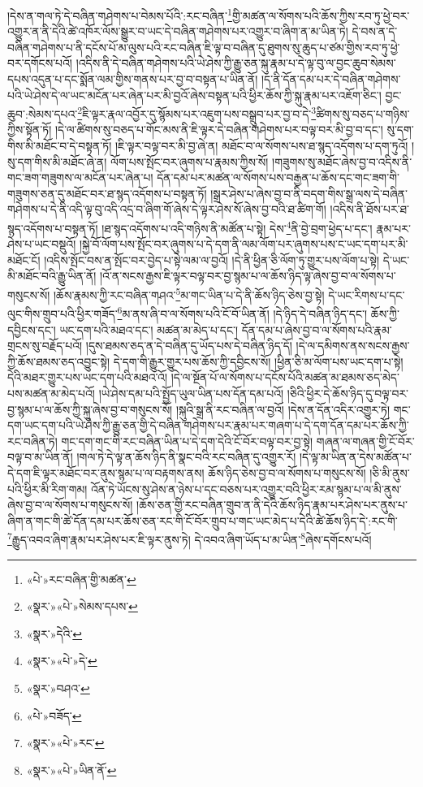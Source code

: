 །དེས་ན་གལ་ཏེ་དེ་བཞིན་གཤེགས་པ་བེམས་པོའི་:རང་བཞིན་\footnote{«པེ་»རང་བཞིན་གྱི་མཚན་}གྱི་མཚན་ལ་སོགས་པའི་ཆོས་ཀྱིས་རབ་ཏུ་ཕྱེ་བར་འགྱུར་ན་ནི་དེའི་ཚེ་འཁོར་ལོས་སྒྱུར་བ་ཡང་དེ་བཞིན་གཤེགས་པར་འགྱུར་བ་ཞིག་ན་མ་ཡིན་ཏེ། དེ་བས་ན་དེ་བཞིན་གཤེགས་པ་ནི་དངོས་པོ་མ་ལུས་པའི་རང་བཞིན་ཇི་ལྟ་བ་བཞིན་དུ་ཐུགས་སུ་ཆུད་པ་ཙམ་གྱིས་རབ་ཏུ་ཕྱེ་བར་དགོངས་པའོ། །འདིས་ནི་དེ་བཞིན་གཤེགས་པའི་ཡེ་ཤེས་ཀྱི་རྒྱུ་ཅན་སྐུ་རྣམ་པ་དེ་ལྟ་བུ་ལ་བྱང་ཆུབ་སེམས་དཔས་འདུན་པ་དང་སྨོན་ལམ་གྱིས་གནས་པར་བྱ་བ་བསྟན་པ་ཡིན་ནོ། །ད་ནི་དོན་དམ་པར་དེ་བཞིན་གཤེགས་པའི་ཡེ་ཤེས་དེ་ལ་ཡང་མངོན་པར་ཞེན་པར་མི་བྱའོ་ཞེས་བསྟན་པའི་ཕྱིར་ཆོས་ཀྱི་སྐུ་རྣམ་པར་འཇོག་ཅིང་། བྱང་ཆུབ་:སེམས་དཔའ་\footnote{«སྣར་»«པེ་»སེམས་དཔས་}ཇི་ལྟར་རྣལ་འབྱོར་དུ་སྙོམས་པར་འཇུག་པས་བསྒྲུབ་པར་བྱ་བ་དེ་\footnote{«སྣར་»དེའི་}ཚིགས་སུ་བཅད་པ་གཉིས་ཀྱིས་སྟོན་ཏོ། །དེ་ལ་ཚིགས་སུ་བཅད་པ་གོང་མས་ནི་ཇི་ལྟར་དེ་བཞིན་གཤེགས་པར་བལྟ་བར་མི་བྱ་བ་དང་། སུ་དག་གིས་མི་མཐོང་བ་དེ་བསྟན་ཏོ། །ཇི་ལྟར་བལྟ་བར་མི་བྱ་ཞེ་ན། མཐོང་བ་ལ་སོགས་པས་ཐ་སྙད་འདོགས་པ་དག་ཏུའོ། །སུ་དག་གིས་མི་མཐོང་ཞེ་ན། ལོག་པས་སྤོང་བར་ཞུགས་པ་རྣམས་ཀྱིས་སོ། །གཟུགས་སུ་མཐོང་ཞེས་བྱ་བ་འདིས་ནི་གང་ཟག་གཟུགས་ལ་མངོན་པར་ཞེན་པ། དོན་དམ་པར་མཚན་ལ་སོགས་པས་བརྒྱན་པ་ཆོས་དང་གང་ཟག་གི་གཟུགས་ཅན་དུ་མཐོང་བར་ཐ་སྙད་འདོགས་པ་བསྟན་ཏོ། །སྒྲར་ཤེས་པ་ཞེས་བྱ་བ་ནི་བདག་གིས་སྒྲ་ལས་དེ་བཞིན་གཤེགས་པ་དེ་ནི་འདི་ལྟ་བུ་འདི་འདྲ་བ་ཞིག་གོ་ཞེས་དེ་ལྟར་ཤེས་སོ་ཞེས་བྱ་བའི་ཐ་ཚིག་གོ། །འདིས་ནི་ཐོས་པར་ཐ་སྙད་འདོགས་པ་བསྟན་ཏོ། །ཐ་སྙད་འདོགས་པ་འདི་གཉིས་ནི་མཚོན་པ་སྟེ། དེས་\footnote{«སྣར་»«པེ་»དེ་}ནི་བྱེ་བྲག་ཕྱེད་པ་དང་། རྣམ་པར་ཤེས་པ་ཡང་བསྡུའོ། །སྐྱེ་བོ་ལོག་པས་སྤོང་བར་ཞུགས་པ་དེ་དག་ནི་ལམ་ལོག་པར་ཞུགས་པས་ང་ཡང་དག་པར་མི་མཐོང་ངོ། །འདིས་སྤོང་བས་ན་སྤོང་བར་བྱེད་པ་སྟེ་ལམ་ལ་བྱའོ། །དེ་ནི་ཕྱིན་ཅི་ལོག་ཏུ་གྱུར་པས་ལོག་པ་སྟེ། དེ་ཡང་མི་མཐོང་བའི་རྒྱུ་ཡིན་ནོ། །འོ་ན་སངས་རྒྱས་ཇི་ལྟར་བལྟ་བར་བྱ་སྙམ་པ་ལ་ཆོས་ཉིད་ལྟ་ཞེས་བྱ་བ་ལ་སོགས་པ་གསུངས་སོ། །ཆོས་རྣམས་ཀྱི་རང་བཞིན་གཤའ་\footnote{«སྣར་»བཤའ་}མ་གང་ཡིན་པ་དེ་ནི་ཆོས་ཉིད་ཅེས་བྱ་སྟེ། དེ་ཡང་རིགས་པ་དང་ལུང་གིས་གྲུབ་པའི་ཕྱིར་གཟོད་\footnote{«པེ་»བཟོད་}མ་ནས་ཞི་བ་ལ་སོགས་པའི་ངོ་བོ་ཡིན་ནོ། །དེ་ཉིད་དེ་བཞིན་ཉིད་དང་། ཆོས་ཀྱི་དབྱིངས་དང་། ཡང་དག་པའི་མཐའ་དང་། མཚན་མ་མེད་པ་དང་། དོན་དམ་པ་ཞེས་བྱ་བ་ལ་སོགས་པའི་རྣམ་གྲངས་སུ་བརྗོད་པའོ། །དུས་ཐམས་ཅད་ན་དེ་བཞིན་དུ་ཡོད་པས་དེ་བཞིན་ཉིད་དོ། །དེ་ལ་དམིགས་ནས་སངས་རྒྱས་ཀྱི་ཆོས་ཐམས་ཅད་འབྱུང་སྟེ། དེ་དག་གི་རྒྱུར་གྱུར་པས་ཆོས་ཀྱི་དབྱིངས་སོ། །ཕྱིན་ཅི་མ་ལོག་པས་ཡང་དག་པ་སྟེ། དེའི་མཐར་གྱུར་པས་ཡང་དག་པའི་མཐའ་འོ། །དེ་ལ་སྔོན་པོ་ལ་སོགས་པ་དངོས་པོའི་མཚན་མ་ཐམས་ཅད་མེད་པས་མཚན་མ་མེད་པའོ། །ཡེ་ཤེས་དམ་པའི་སྤྱོད་ཡུལ་ཡིན་པས་དོན་དམ་པའོ། །ཅིའི་ཕྱིར་དེ་ཆོས་ཉིད་དུ་བལྟ་བར་བྱ་སྙམ་པ་ལ་ཆོས་ཀྱི་སྐུ་ཞེས་བྱ་བ་གསུངས་སོ། །སྐུའི་སྒྲ་ནི་རང་བཞིན་ལ་བྱའོ། །དེས་ན་དོན་འདིར་འགྱུར་ཏེ། གང་དག་ཡང་དག་པའི་ཡེ་ཤེས་ཀྱི་རྒྱུ་ཅན་གྱི་དེ་བཞིན་གཤེགས་པར་རྣམ་པར་གཞག་པ་དེ་དག་དོན་དམ་པར་ཆོས་ཀྱི་རང་བཞིན་ཏེ། གང་དག་གང་གི་རང་བཞིན་ཡིན་པ་དེ་དག་དེའི་ངོ་བོར་བལྟ་བར་བྱ་སྟེ། གཞན་ལ་གཞན་གྱི་ངོ་བོར་བལྟ་བ་མ་ཡིན་ནོ། །གལ་ཏེ་དེ་ལྟ་ན་ཆོས་ཉིད་ནི་སྣང་བའི་རང་བཞིན་དུ་འགྱུར་རོ། །དེ་ལྟ་མ་ཡིན་ན་དེས་མཚོན་པ་དེ་དག་ཇི་ལྟར་མཐོང་བར་ནུས་སྙམ་པ་ལ་བརྟགས་ནས། ཆོས་ཉིད་ཅེས་བྱ་བ་ལ་སོགས་པ་གསུངས་སོ། །ཅི་མི་ནུས་པའི་ཕྱིར་མི་རིག་གམ། འོན་ཏེ་ཡོངས་སུ་ཤེས་ན་ཉེས་པ་དང་བཅས་པར་འགྱུར་བའི་ཕྱིར་རམ་སྙམ་པ་ལ་མི་ནུས་ཞེས་བྱ་བ་ལ་སོགས་པ་གསུངས་སོ། །ཆོས་ཅན་གྱི་རང་བཞིན་གྲུབ་ན་ནི་དེའི་ཆོས་ཉིད་རྣམ་པར་ཤེས་པར་ནུས་པ་ཞིག་ན་གང་གི་ཚེ་དོན་དམ་པར་ཆོས་ཅན་རང་གི་ངོ་བོར་གྲུབ་པ་གང་ཡང་མེད་པ་དེའི་ཚེ་ཆོས་ཉིད་དེ་:རང་གི་\footnote{«སྣར་»«པེ་»རང་}རྒྱུད་འབའ་ཞིག་རྣམ་པར་ཤེས་པར་ཇི་ལྟར་ནུས་ཏེ། དེ་འབའ་ཞིག་ཡོད་པ་མ་ཡིན་\footnote{«སྣར་»«པེ་»ཡིན་ནོ་}ཞེས་དགོངས་པའོ། 